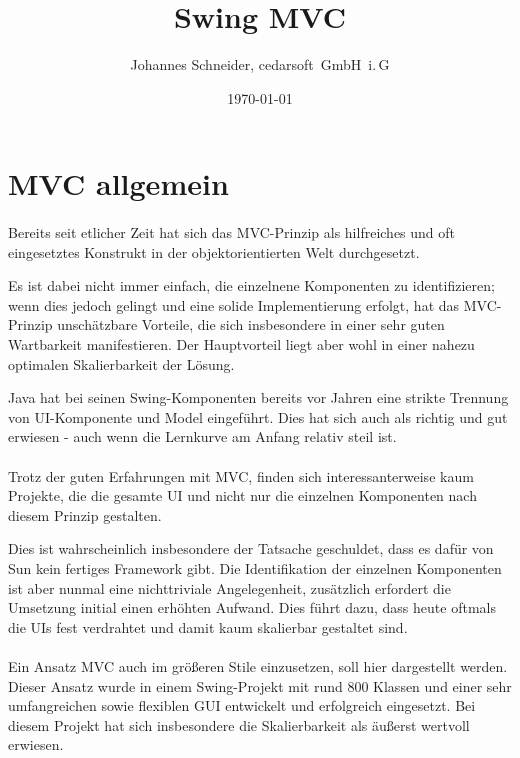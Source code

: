 \documentclass[oneside,a4paper]{scrartcl}
\author{Johannes Schneider, cedarsoft~GmbH~i.\,G}
\title{Swing MVC}
\date{\today}
\begin{document}
\maketitle
\tableofcontents


\section{MVC allgemein}

\paragraph{}
Bereits seit etlicher Zeit hat sich das MVC-Prinzip als hilfreiches und oft eingesetztes Konstrukt
in der objektorientierten Welt durchgesetzt. 

Es ist dabei nicht immer einfach, die einzelnene
Komponenten zu identifizieren; wenn dies jedoch gelingt und eine solide Implementierung erfolgt, 
hat das MVC-Prinzip unschätzbare Vorteile, die sich insbesondere in einer sehr guten Wartbarkeit manifestieren. 
Der Hauptvorteil liegt aber wohl in einer nahezu optimalen Skalierbarkeit der Lösung.

Java hat bei seinen Swing-Komponenten bereits vor Jahren eine strikte Trennung von UI-Komponente und Model eingeführt.
Dies hat sich auch als richtig und gut erwiesen - auch wenn die Lernkurve am Anfang relativ steil ist.

\paragraph{}
Trotz der guten Erfahrungen mit MVC, finden sich interessanterweise kaum Projekte, die die gesamte UI und nicht
nur die einzelnen Komponenten nach diesem Prinzip gestalten.

Dies ist wahrscheinlich insbesondere der Tatsache geschuldet, dass es dafür von Sun kein fertiges Framework gibt.
Die Identifikation der einzelnen Komponenten ist aber nunmal eine nichttriviale Angelegenheit, zusätzlich
erfordert die Umsetzung initial einen erhöhten Aufwand. Dies führt dazu, dass heute oftmals die UIs fest
verdrahtet und damit kaum skalierbar gestaltet sind.

\paragraph{}
Ein Ansatz MVC auch im größeren Stile einzusetzen, soll hier dargestellt werden.
Dieser Ansatz wurde in einem Swing-Projekt mit rund 800 Klassen und einer sehr umfangreichen sowie flexiblen
GUI entwickelt und erfolgreich eingesetzt. Bei diesem Projekt hat sich insbesondere die Skalierbarkeit als
äußerst wertvoll erwiesen.
\end{document}
